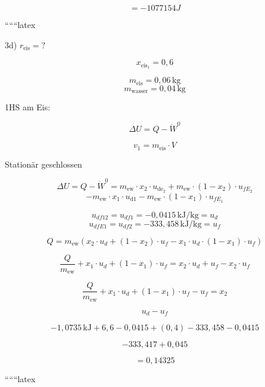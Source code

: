 \[
= -1077154 J
\]

``````latex


3d) \(r_{\text{eis}} = ?\)

\[
x_{\text{eis}_1} = 0,6
\]

\[
m_{\text{eis}} = 0,06 \, \text{kg}
\]
\[
m_{\text{wasser}} = 0,04 \, \text{kg}
\]

1HS am Eis:

\[
\Delta U = Q - \dot{W}^0
\]

\[
v_1 = m_{\text{eis}} \cdot V
\]

Stationär geschlossen

\[
\Delta U = Q - \dot{W}^0 = m_{\text{ew}} \cdot x_2 \cdot u_{\text{de}_2} + m_{\text{ew}} \cdot (1 - x_2) \cdot u_{fE_2}
\]
\[
- m_{\text{ew}} \cdot x_1 \cdot u_{\text{d}1} - m_{\text{ew}} \cdot (1 - x_1) \cdot u_{fE_1}
\]

\[
u_{df12} = u_{df1} = -0,0415 \, \text{kJ/kg} = u_d
\]
\[
u_{dfE1} = u_{df2} = -333,458 \, \text{kJ/kg} = u_f
\]

\[
Q = m_{\text{ew}} \left( x_2 \cdot u_d + (1 - x_2) \cdot u_f - x_1 \cdot u_d \cdot (1 - x_1) \cdot u_f \right)
\]

\[
\frac{Q}{m_{\text{ew}}} + x_1 \cdot u_d + (1 - x_1) \cdot u_f = x_2 \cdot u_d + u_f - x_2 \cdot u_f
\]

\[
\frac{Q}{m_{\text{ew}}} + x_1 \cdot u_d + (1 - x_1) \cdot u_f - u_f = x_2
\]

\[
u_d - u_f
\]

\[
-1,0735 \, \text{kJ} + 6,6 - 0,0415 + (0,4) - 333,458 - 0,0415
\]

\[
-333,417 + 0,045
\]

\[
= 0,14325
\]

``````latex


